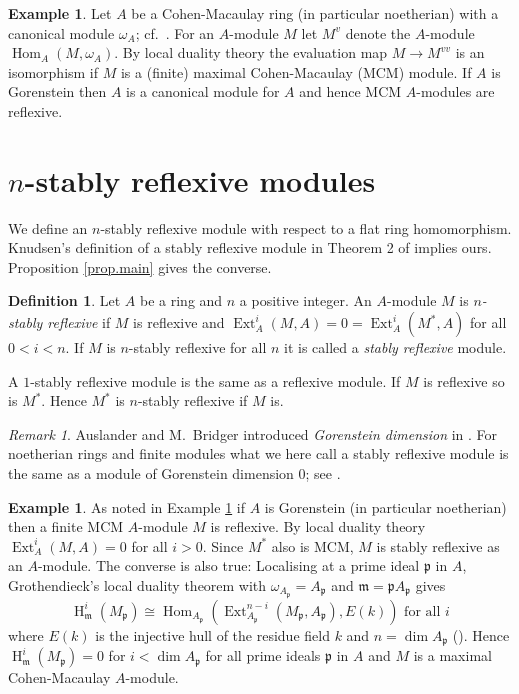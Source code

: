 \documentclass[a4paper,10pt]{amsart}
\theoremstyle{plain}
\theoremstyle{definition}
\newtheorem{defn}[xx]{Definition}%
\newtheorem{ex}[xx]{Example}%
\theoremstyle{remark}
\newtheorem{rem}[xx]{Remark}
\numberwithin{equation}{xx}
\DeclareMathOperator{\Ext}{Ext}
\DeclareMathOperator{\cH}{H}
\DeclareMathOperator{\Hom}{Hom}
\newcommand{\ra}{\rightarrow}
\newcommand{\fr}[1]{\mathfrak{{#1}}}
\newcommand{\hm}[4]{{\Hom}_{#2}^{#1}({#3},{#4})}
\newcommand{\xt}[4]{{\Ext} _{#2}^{#1}({#3},{#4})}
\begin{document}
\begin{ex}\label{ex.G}
Let \(A\) be a Cohen-Macaulay ring (in particular noetherian) with a canonical module \(\omega_{A}\); cf.\ \cite[3.3.16]{bru/her:98}. For an \(A\)-module \(M\) let \(M^{v}\) denote the \(A\)-module \(\hm{}{A}{M}{\omega_{A}}\). By local duality theory the evaluation map \(M\ra M^{vv}\) is an isomorphism if \(M\) is a (finite) maximal Cohen-Macaulay (MCM) module. If \(A\) is Gorenstein then \(A\) is a canonical module for \(A\) and hence MCM \(A\)-modules are reflexive. 
\end{ex}
\section{$n$-stably reflexive modules}
We define an \(n\)-stably reflexive module with respect to a flat ring homomorphism. Knudsen's definition of a stably reflexive module in Theorem 2 of \cite[Appendix]{knu:83a} implies ours. Proposition \ref{prop.main} gives the converse.
\begin{defn}\label{def.nstab}
Let \(A\) be a ring and \(n\) a positive integer. An \(A\)-module \(M\) is \emph{\(n\)-stably reflexive} if \(M\) is reflexive and \(\xt{i}{A}{M}{A}=0=\xt{i}{A}{M^{*}}{A}\) for all \(0<i<n\). If \(M\) is \(n\)-stably reflexive for all \(n\) it is called a \emph{stably reflexive} module.
\end{defn}
A \(1\)-stably reflexive module is the same as a reflexive module. If \(M\) is reflexive so is \(M^{*}\).
Hence \(M^{*}\) is \(n\)-stably reflexive if \(M\) is. 
\begin{rem}\label{rem.Gdim}
Auslander and M.\ Bridger introduced \emph{Gorenstein dimension} in \cite{aus/bri:69}. For noetherian rings and finite modules what we here call a stably reflexive module is the same as a module of Gorenstein dimension \(0\); see \cite[3.8]{aus/bri:69}.
\end{rem}
\begin{ex}\label{ex.Gor}
As noted in Example \ref{ex.G} if \(A\) is Gorenstein (in particular noetherian) then a finite MCM \(A\)-module \(M\) is reflexive. By local duality theory \(\xt{i}{A}{M}{A}=0\) for all \(i>0\). Since \(M^{*}\) also is MCM, \(M\) is stably reflexive as an \(A\)-module. The converse is also true: Localising at a prime ideal \(\fr{p}\) in \( A\), Grothendieck's local duality theorem with \(\omega_{A_{\fr{p}}}= A_{\fr{p}}\) and \(\fr{m}=\fr{p}A_{\fr{p}}\) gives 
\begin{equation}\label{eq.ldt}
\cH^{i}_{\fr{m}}(M_{\fr{p}})\cong \hm{}{A_{\fr{p}}}{\xt{n{-}i}{A_{\fr{p}}}{M_{\fr{p}}}{A_{\fr{p}}}}{E(k)}\text{ for all } i 
\end{equation}
where \(E(k)\) is the injective hull of the residue field \(k\) and \(n=\dim A_{\fr{p}}\) (\cite[3.5.9]{bru/her:98}). Hence \(\cH^{i}_{\fr{m}}(M_{\fr{p}})=0\) for \(i<\dim A_{\fr{p}}\) for all prime ideals \(\fr{p}\) in \( A\) and \( M\) is a maximal Cohen-Macaulay \(A\)-module.
\end{ex}
\end{document}
